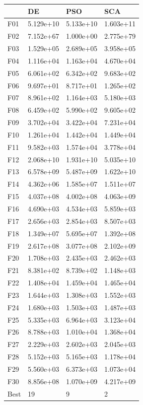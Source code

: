 \begin{tabular}{llll}
\toprule
{} &         DE &        PSO &        SCA \\
\midrule
F01  &  5.129e+10 &  5.133e+10 &  1.603e+11 \\
F02  &  7.152e+67 &  1.000e+00 &  2.775e+79 \\
F03  &  1.529e+05 &  2.689e+05 &  3.958e+05 \\
F04  &  1.116e+04 &  1.163e+04 &  4.670e+04 \\
F05  &  6.061e+02 &  6.342e+02 &  9.683e+02 \\
F06  &  9.697e+01 &  8.717e+01 &  1.265e+02 \\
F07  &  8.961e+02 &  1.164e+03 &  5.180e+03 \\
F08  &  6.459e+02 &  5.990e+02 &  9.605e+02 \\
F09  &  3.702e+04 &  3.422e+04 &  7.231e+04 \\
F10  &  1.261e+04 &  1.442e+04 &  1.449e+04 \\
F11  &  9.582e+03 &  1.574e+04 &  3.778e+04 \\
F12  &  2.068e+10 &  1.931e+10 &  5.035e+10 \\
F13  &  6.578e+09 &  5.487e+09 &  1.622e+10 \\
F14  &  4.362e+06 &  1.585e+07 &  1.511e+07 \\
F15  &  4.037e+08 &  4.002e+08 &  4.063e+09 \\
F16  &  4.690e+03 &  4.534e+03 &  5.859e+03 \\
F17  &  2.656e+03 &  2.854e+03 &  8.507e+03 \\
F18  &  1.349e+07 &  5.695e+07 &  1.392e+08 \\
F19  &  2.617e+08 &  3.077e+08 &  2.102e+09 \\
F20  &  1.708e+03 &  2.435e+03 &  2.462e+03 \\
F21  &  8.381e+02 &  8.739e+02 &  1.148e+03 \\
F22  &  1.408e+04 &  1.459e+04 &  1.465e+04 \\
F23  &  1.644e+03 &  1.308e+03 &  1.552e+03 \\
F24  &  1.680e+03 &  1.503e+03 &  1.487e+03 \\
F25  &  5.335e+03 &  6.964e+03 &  3.123e+04 \\
F26  &  8.788e+03 &  1.010e+04 &  1.368e+04 \\
F27  &  2.229e+03 &  2.602e+03 &  2.045e+03 \\
F28  &  5.152e+03 &  5.165e+03 &  1.178e+04 \\
F29  &  5.560e+03 &  6.373e+03 &  1.073e+04 \\
F30  &  8.856e+08 &  1.070e+09 &  4.217e+09 \\
Best &         19 &          9 &          2 \\
\bottomrule
\end{tabular}
